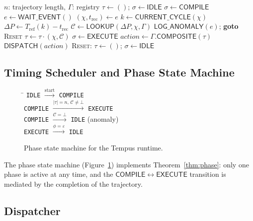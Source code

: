 \documentclass[twocolumn,10pt]{article}
\newcommand{\DP}{\Delta P}          %
\newcommand{\Tref}{T_{\mathrm{ref}}}
\newcommand{\trec}{t_{\mathrm{rec}}}
\newcommand{\calC}{\mathcal{C}}     %
\begin{document}
\begin{algorithm}[ht]
\caption{Trajectory Engine}
\label{alg:traj}
\begin{algorithmic}[1]
\Require $n$: trajectory length, $\Gamma$: registry
\State $\tau \gets ()$; \quad $\sigma \gets \mathsf{IDLE}$
\Loop
  \State $\sigma \gets \mathsf{COMPILE}$
    \State $e \gets \mathsf{WAIT\_EVENT}()$
    \State $(\chi, \trec) \gets e$
    \State $k \gets \mathsf{CURRENT\_CYCLE}(\chi)$
    \State $\DP \gets \Tref(k) - \trec$
    \State $\calC \gets \mathsf{LOOKUP}(\DP, \chi, \Gamma)$
    \If{$\calC = \bot$}
      \State $\mathsf{LOG\_ANOMALY}(e)$; \textbf{goto} \textsc{Reset}
    \EndIf
    \State $\tau \gets \tau \cdot (\chi, \calC)$
  \EndWhile
  \State $\sigma \gets \mathsf{EXECUTE}$
  \State $\mathit{action} \gets \Gamma.\mathsf{COMPOSITE}(\tau)$
  \State $\mathsf{DISPATCH}(\mathit{action})$
  \label{alg:dispatch}
  \State \textsc{Reset}: $\tau \gets ()$; \quad $\sigma \gets \mathsf{IDLE}$
\EndLoop
\end{algorithmic}
\end{algorithm}

\subsection{Timing Scheduler and Phase State Machine}

\begin{figure}[ht]
\centering
\small
\begin{tabbing}
\hspace{3em}\=\kill
\texttt{IDLE}
  \>$\xrightarrow{\text{start}}$
  \texttt{COMPILE} \\[4pt]
\texttt{COMPILE}
  \>$\xrightarrow{|\tau|=n,\,\calC\neq\bot}$
  \texttt{EXECUTE} \\[4pt]
\texttt{COMPILE}
  \>$\xrightarrow{\calC=\bot}$
  \texttt{IDLE} (anomaly) \\[4pt]
\texttt{EXECUTE}
  \>$\xrightarrow{\phi=\varepsilon}$
  \texttt{IDLE}
\end{tabbing}
\caption{Phase state machine for the Tempus runtime.}
\label{fig:fsm}
\end{figure}

The phase state machine (Figure~\ref{fig:fsm}) implements
Theorem~\ref{thm:phase}: only one phase is active at any time,
and the $\mathsf{COMPILE} \leftrightarrow \mathsf{EXECUTE}$
transition is mediated by the completion of the trajectory.

\subsection{Dispatcher}
\end{document}
